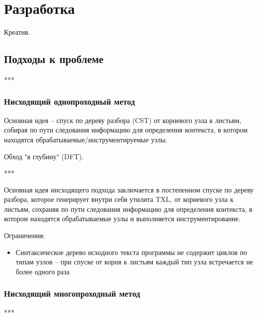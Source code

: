 \chapter{Разработка}

Креатив.

\section{Подходы к проблеме}

***

\subsection{Нисходящий однопроходный метод}

Основная идея -- спуск по дереву разбора (CST) от корневого узла к листьям, собирая по пути следования информацию для определения контекста, в котором находятся обрабатываемые/инструментируемые узлы.

Обход "в глубину" (DFT).

***

Основная идея нисходящего подхода заключается в постепенном спуске по дереву разбора, которое генерирует внутри себя утилита TXL, от корневого узла к листьям, сохраняя по пути следования информацию для определения контекста, в котором находятся обрабатываемые узлы и выполняется инструментирование.

Ограничения:
\begin{itemize}
  \item Синтаксическое дерево исходного текста программы не содержит циклов по типам узлов -- при спуске от корня к листьям каждый тип узла встречается не более одного раза
\end{itemize}

\subsection{Нисходящий многопроходный метод}

***

